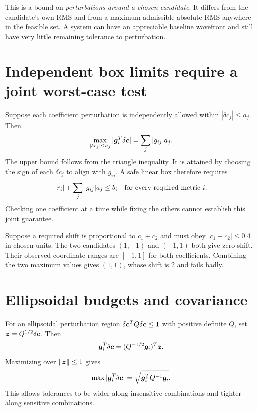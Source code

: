 This is a bound on \emph{perturbations around a chosen candidate}.
It differs from the candidate's own RMS and from a maximum admissible
absolute RMS anywhere in the feasible set.
A system can have an appreciable baseline wavefront and still have
very little remaining tolerance to perturbation.

\section{Independent box limits require a joint worst-case test}
Suppose each coefficient perturbation is independently allowed within
$|\delta c_j|\leq a_j$. Then
\begin{equation}
\max_{|\delta c_j|\leq a_j}
|\bm{g}_i^T\delta\bm{c}|
=\sum_j|g_{ij}|a_j.
\label{eq:boxsupport}
\end{equation}
The upper bound follows from the triangle inequality.
It is attained by choosing the sign of each $\delta c_j$ to align
with $g_{ij}$.
A safe linear box therefore requires
\begin{equation}
|r_i|+\sum_j|g_{ij}|a_j\leq b_i
\quad\hbox{for every required metric }i.
\label{eq:boxbudget}
\end{equation}
Checking one coefficient at a time while fixing the others cannot
establish this joint guarantee.

Suppose a required shift is proportional to $c_1+c_2$ and must obey
$|c_1+c_2|\leq0.4$ in chosen units.
The two candidates $(1,-1)$ and $(-1,1)$ both give zero shift.
Their observed coordinate ranges are $[-1,1]$ for both coefficients.
Combining the two maximum values gives $(1,1)$, whose shift is 2
and fails badly.


\section{Ellipsoidal budgets and covariance}
For an ellipsoidal perturbation region
$\delta\bm{c}^TQ\delta\bm{c}\leq1$ with positive definite $Q$,
set $\bm{z}=Q^{1/2}\delta\bm{c}$. Then
\[
\bm{g}_i^T\delta\bm{c}
=(Q^{-1/2}\bm{g}_i)^T\bm{z}.
\]
Maximizing over $\left\lVert\bm{z}\right\rVert\leq1$ gives
\begin{equation}
\max|\bm{g}_i^T\delta\bm{c}|
=\sqrt{\bm{g}_i^TQ^{-1}\bm{g}_i}.
\label{eq:ellipsoid}
\end{equation}
This allows tolerances to be wider along insensitive combinations and
tighter along sensitive combinations.

